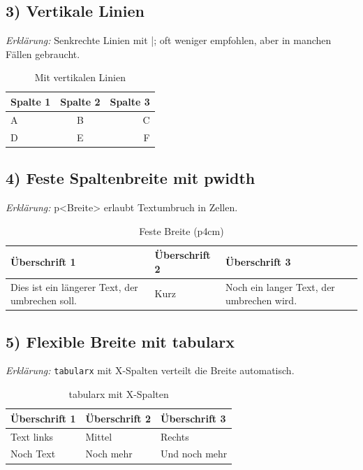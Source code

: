 \documentclass[a4paper,12pt]{article}
\begin{document}
\subsection*{3) Vertikale Linien}
	\textit{Erklärung:} Senkrechte Linien mit |; oft weniger empfohlen, aber in manchen Fällen gebraucht.
\begin{table}[h!]
	\centering
	\caption{Mit vertikalen Linien}
	\begin{tabular}{|l|c|r|}
		\hline
		Spalte 1 & Spalte 2 & Spalte 3 \\
		\hline
		A & B & C \\
		D & E & F \\
		\hline
	\end{tabular}
\end{table}

\subsection*{4) Feste Spaltenbreite mit p{width}}
	\textit{Erklärung:} p{<Breite>} erlaubt Textumbruch in Zellen.
\begin{table}[h!]
	\centering
	\caption{Feste Breite (p{4cm})}
	\begin{tabular}{p{4cm}p{4cm}p{4cm}}

		 Überschrift 1 &  Überschrift 2 &  Überschrift 3 \\
		\midrule
		Dies ist ein längerer Text, der umbrechen soll. & Kurz & Noch ein langer Text, der umbrechen wird. \\
		\bottomrule
	\end{tabular}
\end{table}

\subsection*{5) Flexible Breite mit tabularx}
	\textit{Erklärung:} \texttt{tabularx} mit X-Spalten verteilt die Breite automatisch.
\begin{table}[h!]
	\centering
	\caption{tabularx mit X-Spalten}
	\begin{tabularx}{\textwidth}{X X X}
		
		Überschrift 1 & Überschrift 2 & Überschrift 3 \\
		\midrule
		Text links & Mittel & Rechts \\
		Noch Text & Noch mehr & Und noch mehr \\
		\bottomrule
	\end{tabularx}
\end{table}
\end{document}
